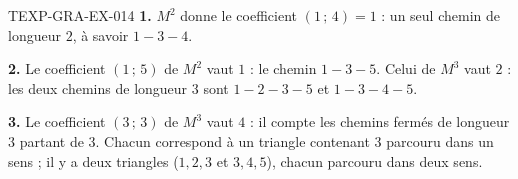% 
% 
\begin{corrige}{TEXP-GRA-EX-014}
\textbf{1.} $M^2$ donne le coefficient $(1\,;\,4)=1$ : un seul chemin de
longueur $2$, à savoir $1-3-4$.

\textbf{2.} Le coefficient $(1\,;\,5)$ de $M^2$ vaut $1$ : le chemin $1-3-5$.
Celui de $M^3$ vaut $2$ : les deux chemins de longueur $3$ sont $1-2-3-5$ et
$1-3-4-5$.

\textbf{3.} Le coefficient $(3\,;\,3)$ de $M^3$ vaut $4$ : il compte les
chemins fermés de longueur $3$ partant de $3$. Chacun correspond à un triangle
contenant $3$ parcouru dans un sens ; il y a deux triangles ($1,2,3$ et
$3,4,5$), chacun parcouru dans deux sens.
\end{corrige}
